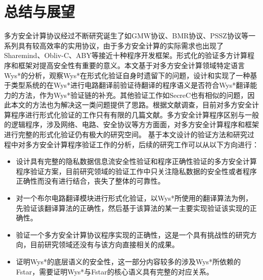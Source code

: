 \chapter{总结与展望}
多方安全计算协议经过不断研究诞生了如GMW协议、BMR协议、PSSZ协议等一系列具有较高效率的实用协议，由于多方安全计算的实际需求也出现了Sharemind、Obliv-C、ABY等接近十种程序开发框架。形式化的验证多方计算程序和框架对提高安全性有重要的意义。本文基于对多方安全计算领域特定语言Wys*的分析，观察Wys*在形式化验证自身时遗留下的问题，设计和实现了一种基于类型系统的在Wys*进行电路翻译前验证待翻译的程序语义是否符合Wys*翻译能力的方法，作为Wys*验证链的补充。其他验证工作如SecreC也有相似的问题，因此本文的方法也为解决这一类问题提供了思路。根据文献调查，目前对多方安全计算程序进行形式化验证的工作只有有限的几篇文献\citep{almeida2018enforcing,rastogi2019textsc,rastogi2017wys}。多方安全计算程序区别与一般的逻辑程序，涉及网络、电路、安全协议等方方面面，对多方安全计算程序和框架进行完整的形式化验证仍有极大的研究空间。
基于本文设计的验证方法和研究过程中对多方安全计算程序验证工作的分析，后续的研究工作可以从以下方向进行：
\begin{itemize}
\item 设计具有完整的隐私数据信息流安全性验证和程序正确性验证的多方安全计算程序验证方案，目前研究领域的验证工作中只关注隐私数据的安全性或者程序正确性而没有进行结合，丧失了整体的可靠性。
\item 对一个布尔电路翻译模块进行形式化验证，以Wys*所使用的翻译算法为例\citep{choi2012secure}，先验证该翻译算法的正确性，然后基于该算法的某一主要实现验证该实现的正确性。
\item 验证一个多方安全计算协议程序实现的正确性，这是一个具有挑战性的研究方向，目前研究领域还没有与该方向直接相关的成果。
\item 证明Wys*的底层语义的安全性，这一部分内容较多的涉及Wys*所依赖的Fstar，需要证明Wys*与Fstar的核心语义具有完整的对应关系。
\end{itemize}

